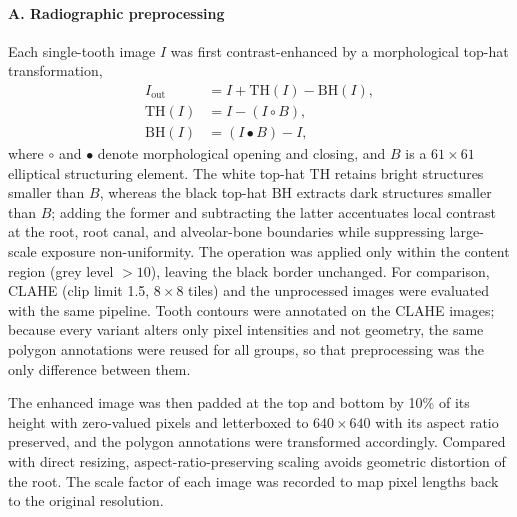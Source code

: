 \paragraph{A. Radiographic preprocessing}
Each single-tooth image $I$ was first contrast-enhanced by a morphological
top-hat transformation,
\begin{equation}
\begin{aligned}
I_{\text{out}} &= I + \mathrm{TH}(I) - \mathrm{BH}(I),\\
\mathrm{TH}(I) &= I - (I \circ B),\\
\mathrm{BH}(I) &= (I \bullet B) - I,
\end{aligned}
\label{eq:tophat}
\end{equation}
where $\circ$ and $\bullet$ denote morphological opening and closing, and $B$ is
a $61\times61$ elliptical structuring element. The white top-hat $\mathrm{TH}$
retains bright structures smaller than $B$, whereas the black top-hat
$\mathrm{BH}$ extracts dark structures smaller than $B$; adding the former and
subtracting the latter accentuates local contrast at the root, root canal, and
alveolar-bone boundaries while suppressing large-scale exposure non-uniformity.
The operation was applied only within the content region (grey level $>10$),
leaving the black border unchanged. For comparison, CLAHE (clip limit 1.5,
$8\times8$ tiles) and the unprocessed images were evaluated with the same
pipeline. Tooth contours were annotated on the CLAHE images; because every
variant alters only pixel intensities and not geometry, the same polygon
annotations were reused for all groups, so that preprocessing was the only
difference between them.

The enhanced image was then padded at the top and bottom by 10\% of its height with
zero-valued pixels and letterboxed to $640\times640$ with its aspect ratio
preserved, and the polygon annotations were transformed accordingly. Compared
with direct resizing, aspect-ratio-preserving scaling avoids geometric distortion
of the root. The scale factor of each image was recorded to map pixel lengths
back to the original resolution.

